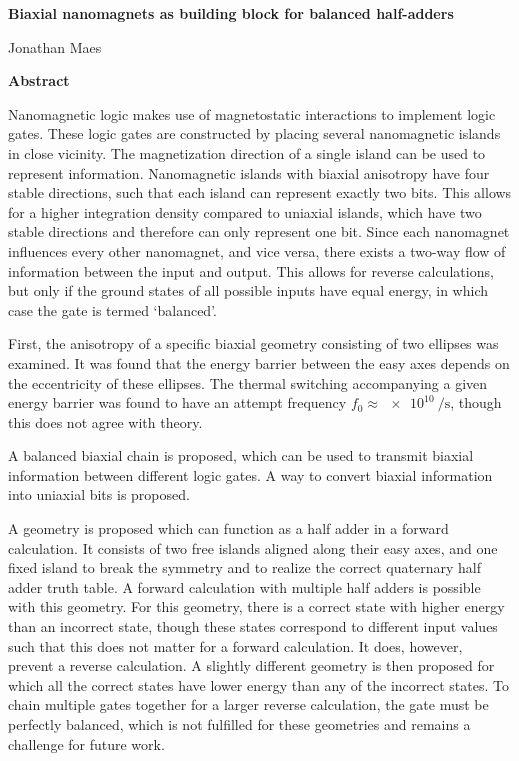 \documentclass[11pt,a4paper,english,twoside]{article}
\begin{document}
\clearpage
{}
\begin{center}
    \Large
    \textbf{Biaxial nanomagnets as building block for balanced half-adders}

    \large
    \vspace{0.4cm}
    Jonathan Maes
       
    \vspace{0.9cm}
    \textbf{Abstract}
\end{center}
Nanomagnetic logic makes use of magnetostatic interactions to implement logic gates. These logic gates are constructed by placing several nanomagnetic islands in close vicinity. The magnetization direction of a single island can be used to represent information. Nanomagnetic islands with biaxial anisotropy have four stable directions, such that each island can represent exactly two bits. This allows for a higher integration density compared to uniaxial islands, which have two stable directions and therefore can only represent one bit. Since each nanomagnet influences every other nanomagnet, and vice versa, there exists a two-way flow of information between the input and output. This allows for reverse calculations, but only if the ground states of all possible inputs have equal energy, in which case the gate is termed `balanced'. \par
First, the anisotropy of a specific biaxial geometry consisting of two ellipses was examined. It was found that the energy barrier between the easy axes depends on the eccentricity of these ellipses. The thermal switching accompanying a given energy barrier was found to have an attempt frequency $f_0 \approx \SI{e10}{\per\second}$, though this does not agree with theory. \par
A balanced biaxial chain is proposed, which can be used to transmit biaxial information between different logic gates. A way to convert biaxial information into uniaxial bits is proposed. \par
A geometry is proposed which can function as a half adder in a forward calculation. It consists of two free islands aligned along their easy axes, and one fixed island to break the symmetry and to realize the correct quaternary half adder truth table. A forward calculation with multiple half adders is possible with this geometry. For this geometry, there is a correct state with higher energy than an incorrect state, though these states correspond to different input values such that this does not matter for a forward calculation. It does, however, prevent a reverse calculation. A slightly different geometry is then proposed for which all the correct states have lower energy than any of the incorrect states. To chain multiple gates together for a larger reverse calculation, the gate must be perfectly balanced, which is not fulfilled for these geometries and remains a challenge for future work.
\end{document}
